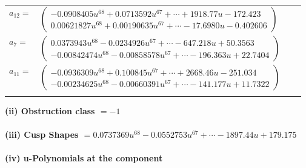 \documentclass[1p]{elsarticle_modified}
\theoremstyle{definition}
\begin{document}
\begin{tabular}{m{7pt} m{180pt} m{7pt} m{180pt} }
\flushright $a_{12}=$&$\begin{pmatrix}-0.0908405 u^{68}+0.0713592 u^{67}+\cdots+1918.77 u-172.423\\0.00621827 u^{68}+0.00190635 u^{67}+\cdots-17.6980 u-0.402606\end{pmatrix}$ \\
\flushright $a_{7}=$&$\begin{pmatrix}0.0373943 u^{68}-0.0234926 u^{67}+\cdots-647.218 u+50.3563\\-0.00842474 u^{68}-0.00858578 u^{67}+\cdots-196.363 u+22.7404\end{pmatrix}$ \\
\flushright $a_{11}=$&$\begin{pmatrix}-0.0936309 u^{68}+0.100845 u^{67}+\cdots+2668.46 u-251.034\\-0.00234625 u^{68}-0.00660391 u^{67}+\cdots-141.177 u+11.7322\end{pmatrix}$\\&\end{tabular}
\flushleft \textbf{(ii) Obstruction class $= -1$}\\~\\
\flushleft \textbf{(iii) Cusp Shapes $= 0.0737369 u^{68}-0.0552753 u^{67}+\cdots-1897.44 u+179.175$}\\~\\
\newpage\renewcommand{\arraystretch}{1}
\flushleft \textbf{(iv) u-Polynomials at the component}\newline \\
\end{document}
